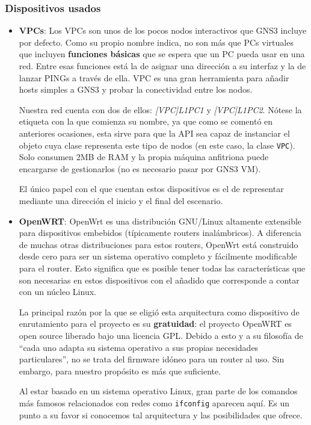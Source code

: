 \subsubsection{Dispositivos usados}
\begin{itemize}
\item \textbf{VPCs}: Los VPCs son unos de los pocos nodos interactivos que GNS3 incluye por defecto. Como su propio nombre indica, no son más que PCs virtuales que incluyen \textbf{funciones básicas} que se espera que un PC pueda usar en una red. Entre esas funciones está la de asignar una dirección a su interfaz y la de lanzar PINGs a través de ella. VPC es una gran herramienta para añadir hosts simples a GNS3 y probar la conectividad entre los nodos\cite{bookgns}.

Nuestra red cuenta con dos de ellos: \textit{[VPC]L1PC1} y \textit{[VPC]L1PC2}. Nótese la etiqueta con la que comienza su nombre, ya que como se comentó en anteriores ocasiones, esta sirve para que la API sea capaz de instanciar el objeto cuya clase representa este tipo de nodos (en este caso, la clase \texttt{VPC}). Solo consumen 2MB de RAM y la propia máquina anfitriona puede encargarse de gestionarlos (no es necesario pasar por GNS3 VM).

El único papel con el que cuentan estos dispositivos es el de representar mediante una dirección el inicio y el final del escenario.

\item \textbf{OpenWRT}: OpenWrt es una distribución GNU/Linux altamente extensible para dispositivos embebidos (típicamente routers inalámbricos). A diferencia de muchas otras distribuciones para estos routers, OpenWrt está construido desde cero para ser un sistema operativo completo y fácilmente modificable para el router. Esto significa que es posible tener todas las características que son necesarias en estos dispositivos con el añadido que corresponde a contar con un núcleo Linux\cite{aboutopenwrt}.

La principal razón por la que se eligió esta arquitectura como dispositivo de enrutamiento para el proyecto es su \textbf{gratuidad}: el proyecto OpenWRT es open source liberado bajo una licencia GPL. Debido a esto y a su filosofía de ``cada uno adapta su sistema operativo a sus propias necesidades particulares'', no se trata del firmware idóneo para un router al uso. Sin embargo, para nuestro propósito es más que suficiente.

Al estar basado en un sistema operativo Linux, gran parte de los comandos más famosos relacionados con redes como \texttt{ifconfig} aparecen aquí. Es un punto a su favor si conocemos tal arquitectura y las posibilidades que ofrece.


\end{itemize}
